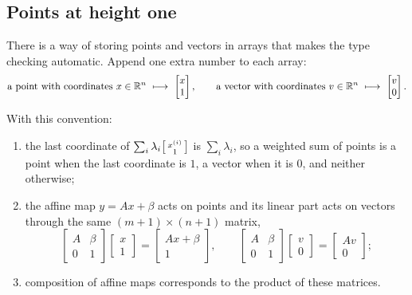 \begin{notechapter}
\section{Points at height one}\label{affine-spaces:sec:homogeneous}

There is a way of storing points and vectors in arrays that makes the type
checking automatic. Append one extra number to each array:
\[
  \text{a point with coordinates }x\in\R^n\ \longmapsto\
  \begin{bmatrix}x\\1\end{bmatrix},
  \qquad
  \text{a vector with coordinates }v\in\R^n\ \longmapsto\
  \begin{bmatrix}v\\0\end{bmatrix} .
\]

\begin{proposition}
\label{affine-spaces:prop:homogeneous}
With this convention:
\begin{enumerate}[nosep]
  \item the last coordinate of $\sum_i\lambda_i\begin{bsmallmatrix}x^{(i)}\\
        1\end{bsmallmatrix}$ is $\sum_i\lambda_i$, so a weighted sum of
        points is a point when the last coordinate is $1$, a vector when it
        is $0$, and neither otherwise;
  \item the affine map $y = Ax + \beta$ acts on points and its linear part
        acts on vectors through the same $(m + 1)\times(n + 1)$ matrix,
        \[
          \begin{bmatrix}A & \beta\\0 & 1\end{bmatrix}
          \begin{bmatrix}x\\1\end{bmatrix}
          = \begin{bmatrix}Ax + \beta\\1\end{bmatrix},
          \qquad
          \begin{bmatrix}A & \beta\\0 & 1\end{bmatrix}
          \begin{bmatrix}v\\0\end{bmatrix}
          = \begin{bmatrix}Av\\0\end{bmatrix} ;
        \]
  \item composition of affine maps corresponds to the product of these
        matrices.
\end{enumerate}
\end{proposition}


\end{notechapter}
